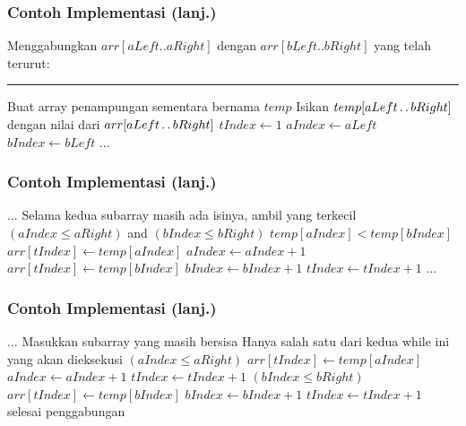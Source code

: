 \begin{frame}
\frametitle{Contoh Implementasi (lanj.)}
Menggabungkan $arr[aLeft..aRight]$ dengan $arr[bLeft..bRight]$ yang telah terurut:
\noindent\rule{10cm}{0.4pt}
\begin{codebox}
\li \Comment Buat array penampungan sementara bernama $temp$
\li \Comment Isikan $temp[aLeft \mathinner{\ldotp\ldotp} bRight]$ dengan nilai dari $arr[aLeft \mathinner{\ldotp\ldotp} bRight]$
\li $tIndex \gets 1$
\li $aIndex \gets aLeft$
\li $bIndex \gets bLeft$
\li $...$
\end{codebox}
\end{frame}

\begin{frame}
\frametitle{Contoh Implementasi (lanj.)}
\begin{codebox}
\setcounter{codelinenumber}{4}
\li $...$
\li \Comment Selama kedua subarray masih ada isinya, ambil yang terkecil
\li \While $(aIndex \leq aRight)$ and $(bIndex \leq bRight)$ \Do
\li   \If $temp[aIndex] < temp[bIndex]$ \Then
\li     $arr[tIndex] \gets temp[aIndex]$
\li     $aIndex \gets aIndex + 1$
\li   \Else
\li     $arr[tIndex] \gets temp[bIndex]$
\li     $bIndex \gets bIndex + 1$
      \End
\li   $tIndex \gets tIndex + 1$
    \End
\li $...$
\end{codebox}
\end{frame}

\begin{frame}
\frametitle{Contoh Implementasi (lanj.)}
\begin{codebox}
\setcounter{codelinenumber}{13}
\li $...$
\li \Comment Masukkan subarray yang masih bersisa
\li \Comment Hanya salah satu dari kedua while ini yang akan dieksekusi
\li \While $(aIndex \leq aRight)$ \Do
\li   $arr[tIndex] \gets temp[aIndex]$
\li   $aIndex \gets aIndex + 1$
\li   $tIndex \gets tIndex + 1$
    \End
\li \While $(bIndex \leq bRight)$ \Do
\li   $arr[tIndex] \gets temp[bIndex]$
\li   $bIndex \gets bIndex + 1$
\li   $tIndex \gets tIndex + 1$
    \End
\li \Comment selesai penggabungan
\end{codebox}
\end{frame}

